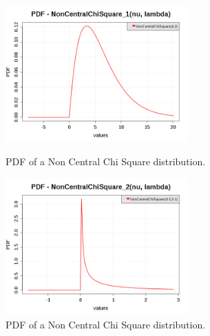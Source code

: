 \begin{figure}[H]
  \begin{minipage}{10cm}
    \begin{center}
      \includegraphics[width=7cm]{pdf_NonCentralChiSquare_1.png}
      \caption{PDF of a Non Central Chi Square distribution.}
      \label{PDFNonCentralChiSquare1}
    \end{center}
  \end{minipage}
  \hfill
  \begin{minipage}{10cm}
    \begin{center}
      \includegraphics[width=7cm]{pdf_NonCentralChiSquare_2.png}
      \caption{PDF of a Non Central Chi Square distribution.}
      \label{PDFNonCentralChiSquare2}
    \end{center}
  \end{minipage}
\end{figure}


